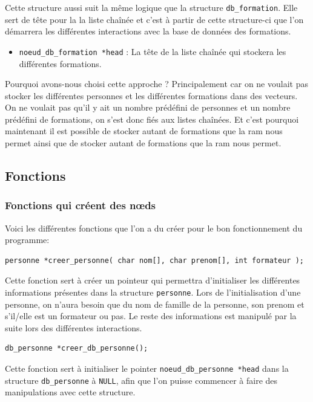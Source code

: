 \documentclass[11pt]{article}
\begin{document}
Cette structure aussi suit la même logique que la structure \texttt{db\_formation}. Elle sert de tête pour la la liste chaînée et c'est à partir de cette structure-ci que l'on démarrera les différentes interactions avec la base de données des formations.
\begin{itemize}
\item \texttt{noeud\_db\_formation *head} : La tête de la liste chaînée qui stockera les différentes formations.
\end{itemize}

Pourquoi avons-nous choisi cette approche ? Principalement car on ne voulait pas stocker les différentes personnes et les différentes formations dans des vecteurs. On ne voulait pas qu'il y ait un nombre prédéfini de personnes et un nombre prédéfini de formations, on s'est donc fiés aux listes chaînées. Et c'est pourquoi maintenant il est possible de stocker autant de formations que la \acrshort{ram} nous permet ainsi que de stocker autant de formations que la \acrshort{ram} nous permet.

\newpage
\subsection{Fonctions}
\subsubsection{Fonctions qui créent des n\oe{}ds}
Voici les différentes fonctions que l'on a du créer pour le bon fonctionnement du programme:
\begin{lstlisting}[firstnumber=144]
  personne *creer_personne( char nom[], char prenom[], int formateur );
\end{lstlisting}

Cette fonction sert à créer un pointeur qui permettra d'initialiser les différentes informations présentes dans la structure \texttt{personne}. Lors de l'initialisation d'une personne, on n'aura besoin que du nom de famille de la personne, son prenom et s'il/elle est un formateur ou pas. Le reste des informations est manipulé par la suite lors des différentes interactions.

\begin{lstlisting}[firstnumber=168]
  db_personne *creer_db_personne();
\end{lstlisting}

Cette fonction sert à initialiser le pointer \texttt{noeud\_db\_personne *head} dans la structure \texttt{db\_personne} à \texttt{NULL}, afin que l'on puisse commencer à faire des manipulations avec cette structure.
\end{document}
